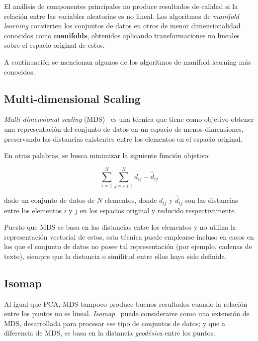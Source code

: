 El análisis de componentes principales no produce resultados de calidad si la relación entre las variables aleatorias es no lineal.
Los algoritmos de \textit{manifold learning} convierten los conjuntos de datos en otros de menor dimensionalidad conocidos como \textbf{manifolds}, obtenidos aplicando transformaciones no lineales sobre el espacio original de estos.

A continuación se mencionan algunos de los algoritmos de manifold learning más conocidos.

\subsection{Multi-dimensional Scaling}\label{subsec:MDS}

\textit{Multi-dimensional scaling} (MDS)~\cite{deLeeuw00,Groenen14} es una técnica que tiene como objetivo obtener una representación del conjunto de datos en un espacio de menos dimensiones, preservando las distancias existentes entre los elementos en el espacio original.

En otras palabras, se busca minimizar la siguiente función objetivo:

\begin{equation}
    \label{eq:MDS}
    \sum_{i=1}^{N}\sum_{j=i+1}^{N}{d_{ij} - \hat{d}_{ij}}
\end{equation}

\noindent
dado un conjunto de datos de $N$ elementos, donde $d_{ij}$ y $\hat{d}_{ij}$ son las distancias entre los elementos $i$ y $j$ en los espacios original y reducido respectivamente.

Puesto que MDS se basa en las distancias entre los elementos y no utiliza la representación vectorial de estos, esta técnica puede emplearse incluso en casos en los que el conjunto de datos no posee tal representación (por ejemplo, cadenas de texto), siempre que la distancia o similitud entre ellos haya sido definida.

\subsection{Isomap}\label{subsec:isomap}

Al igual que PCA, MDS tampoco produce buenos resultados cuando la relación entre los puntos no es lineal.
\textit{Isomap}~\cite{Tenenbaum00} puede considerarse como una extensión de MDS, desarrollada para procesar ese tipo de conjuntos de datos; y que a diferencia de MDS, se basa en la distancia \textit{geodésica} entre los puntos.

